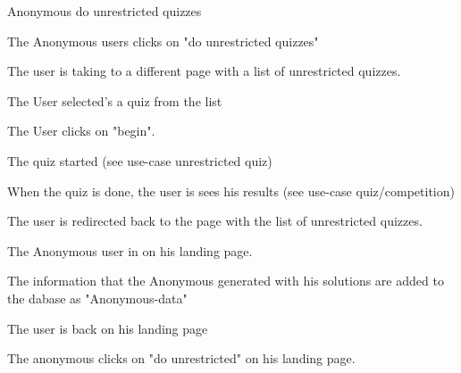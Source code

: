 \begin{uc}{Anonymous do unrestricted quizzes}

    \begin{uc-mss}
    	\item The Anonymous users clicks on "do unrestricted quizzes"
    	\item The user is taking to a different page with a list of unrestricted quizzes.
    	\item The User selected's a quiz from the list
    	\item The User clicks on "begin".
    	\item The quiz started (see use-case unrestricted quiz)
    	\item When the quiz is done, the user is sees his results (see use-case quiz/competition)
    	\item The user is redirected back to the page with the list of unrestricted quizzes.
    \end{uc-mss}

    \begin{uc-pre}
        \item The Anonymous user in on his landing page.
    \end{uc-pre}

    \begin{uc-post}
        \item The information that the Anonymous generated with his solutions are added to the dabase as "Anonymous-data"
        \item The user is back on his landing page
    \end{uc-post}

    \begin{uc-trig}
        The anonymous clicks on "do unrestricted" on his landing page.
    \end{uc-trig}

\end{uc}
